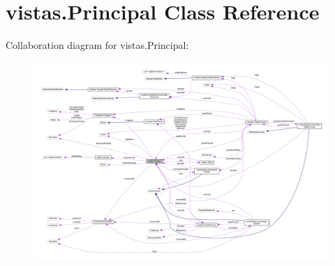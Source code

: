 \hypertarget{classvistas_1_1_principal}{}\section{vistas.\+Principal Class Reference}
\label{classvistas_1_1_principal}


Collaboration diagram for vistas.\+Principal\+:
\nopagebreak
\begin{figure}[H]
\begin{center}
\leavevmode
\includegraphics[width=350pt]{classvistas_1_1_principal__coll__graph}
\end{center}
\end{figure}
